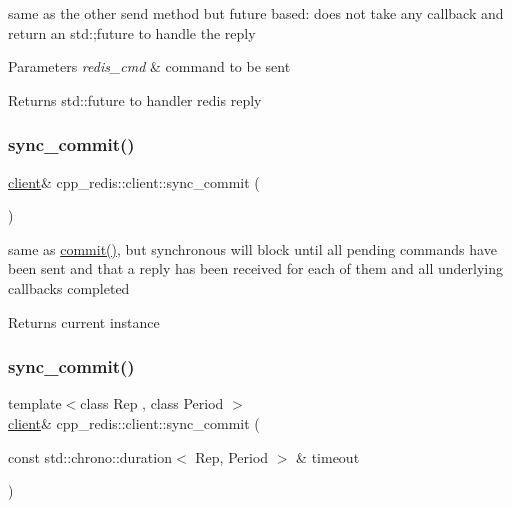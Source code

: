 same as the other send method but future based\+: does not take any callback and return an std\+:;future to handle the reply


\begin{DoxyParams}{Parameters}
{\em redis\+\_\+cmd} & command to be sent \\
\hline
\end{DoxyParams}
\begin{DoxyReturn}{Returns}
std\+::future to handler redis reply 
\end{DoxyReturn}
\mbox{\label{classcpp__redis_1_1client_ad7d61dadf264bcf27092d9f7f3ff1fd7}} 
\subsubsection{\texorpdfstring{sync\+\_\+commit()}{sync\_commit()}\hspace{0.1cm}{\footnotesize\ttfamily [1/2]}}
{\footnotesize\ttfamily \mbox{\hyperlink{classcpp__redis_1_1client}{client}}\& cpp\+\_\+redis\+::client\+::sync\+\_\+commit (\begin{DoxyParamCaption}{ }\end{DoxyParamCaption})}

same as \mbox{\hyperlink{classcpp__redis_1_1client_a18e123faf9400013ad2f1063e5824dc0}{commit()}}, but synchronous will block until all pending commands have been sent and that a reply has been received for each of them and all underlying callbacks completed

\begin{DoxyReturn}{Returns}
current instance 
\end{DoxyReturn}
\mbox{\label{classcpp__redis_1_1client_a79a24c8367cb1229fd2c4c38d0f82533}} 
\subsubsection{\texorpdfstring{sync\+\_\+commit()}{sync\_commit()}\hspace{0.1cm}{\footnotesize\ttfamily [2/2]}}
{\footnotesize\ttfamily template$<$class Rep , class Period $>$ \\
\mbox{\hyperlink{classcpp__redis_1_1client}{client}}\& cpp\+\_\+redis\+::client\+::sync\+\_\+commit (\begin{DoxyParamCaption}\item[{const std\+::chrono\+::duration$<$ Rep, Period $>$ \&}]{timeout }\end{DoxyParamCaption})\hspace{0.3cm}{\ttfamily [inline]}}

